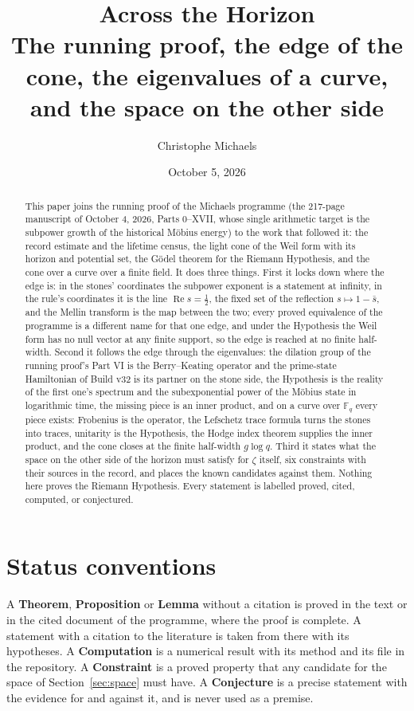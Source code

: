\documentclass[11pt]{article}
\title{Across the Horizon\\ \large The running proof, the edge of the cone, the eigenvalues of a curve,\\ and the space on the other side}
\author{Christophe Michaels}
\date{October 5, 2026}
\theoremstyle{definition}
\theoremstyle{remark}
\newcommand{\F}{\mathbb F}
\newcommand{\Ree}{\operatorname{Re}}
\begin{document}
\maketitle

\begin{abstract}
\noindent This paper joins the running proof of the Michaels programme (the 217-page manuscript of October 4, 2026, Parts 0--XVII, whose single arithmetic target is the subpower growth of the historical Möbius energy) to the work that followed it: the record estimate and the lifetime census, the light cone of the Weil form with its horizon and potential set, the Gödel theorem for the Riemann Hypothesis, and the cone over a curve over a finite field. It does three things. First it locks down where the edge is: in the stones' coordinates the subpower exponent is a statement at infinity, in the rule's coordinates it is the line $\Ree s=\tfrac12$, the fixed set of the reflection $s\mapsto1-\bar s$, and the Mellin transform is the map between the two; every proved equivalence of the programme is a different name for that one edge, and under the Hypothesis the Weil form has no null vector at any finite support, so the edge is reached at no finite half-width. Second it follows the edge through the eigenvalues: the dilation group of the running proof's Part VI is the Berry--Keating operator and the prime-state Hamiltonian of Build v32 is its partner on the stone side, the Hypothesis is the reality of the first one's spectrum and the subexponential power of the Möbius state in logarithmic time, the missing piece is an inner product, and on a curve over $\F_q$ every piece exists: Frobenius is the operator, the Lefschetz trace formula turns the stones into traces, unitarity is the Hypothesis, the Hodge index theorem supplies the inner product, and the cone closes at the finite half-width $g\log q$. Third it states what the space on the other side of the horizon must satisfy for $\zeta$ itself, six constraints with their sources in the record, and places the known candidates against them. Nothing here proves the Riemann Hypothesis. Every statement is labelled proved, cited, computed, or conjectured.
\end{abstract}

\tableofcontents

\section*{Status conventions}
A \textbf{Theorem}, \textbf{Proposition} or \textbf{Lemma} without a citation is proved in the text or in the cited document of the programme, where the proof is complete. A statement with a citation to the literature is taken from there with its hypotheses. A \textbf{Computation} is a numerical result with its method and its file in the repository. A \textbf{Constraint} is a proved property that any candidate for the space of Section~\ref{sec:space} must have. A \textbf{Conjecture} is a precise statement with the evidence for and against it, and is never used as a premise.
\end{document}
